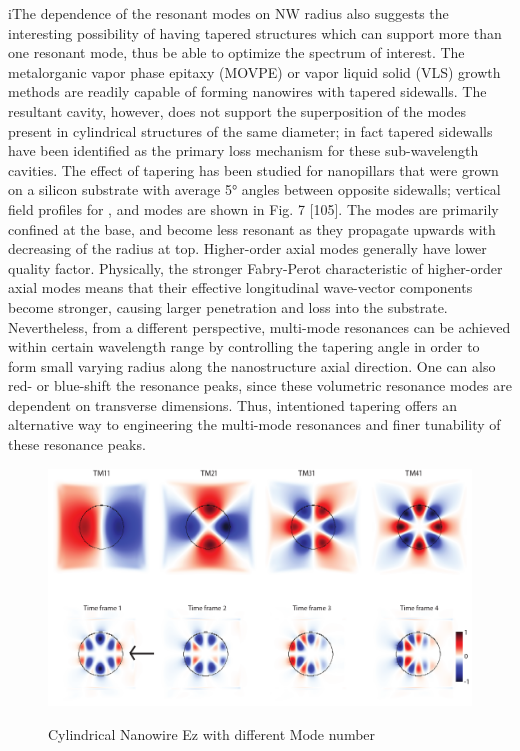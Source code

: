 iThe dependence of the resonant modes on NW radius also suggests the
interesting possibility of having tapered structures which can support more
than one resonant mode, thus be able to optimize the spectrum of interest.  The
metalorganic vapor phase epitaxy (MOVPE) or vapor liquid solid (VLS) growth
methods are readily capable of forming nanowires with tapered sidewalls. The
resultant cavity, however, does not support the superposition of the modes
present in cylindrical structures of the same diameter; in fact tapered
sidewalls have been identified as the primary loss mechanism for these
sub-wavelength cavities.  The effect of  tapering has been studied for
nanopillars that were grown on a silicon substrate with average 5° angles
between opposite sidewalls; vertical field profiles for ,  and  modes are shown
in Fig. 7 [105]. The modes are primarily confined at the base, and become less
resonant as they propagate upwards with decreasing of the radius at top.
Higher-order axial modes generally have lower quality factor. Physically, the
stronger Fabry-Perot characteristic of higher-order axial modes means that
their effective longitudinal wave-vector components become stronger, causing
larger penetration and loss into the substrate. Nevertheless, from a different
perspective, multi-mode resonances can be achieved within certain wavelength
range by controlling the tapering angle in order to form small varying radius
along the nanostructure axial direction. One can also red- or blue-shift the
resonance peaks, since these volumetric resonance modes are dependent on
transverse dimensions. Thus, intentioned tapering offers an alternative way to
engineering the multi-mode resonances and finer tunability of these resonance
peaks.

\begin{figure}
  \caption{Cylindrical Nanowire Ez with different Mode number}
  \centering
  \includegraphics[width=\textwidth]{pictures/LM/CylindEz}
  \label{CylindEz}
\end{figure}

